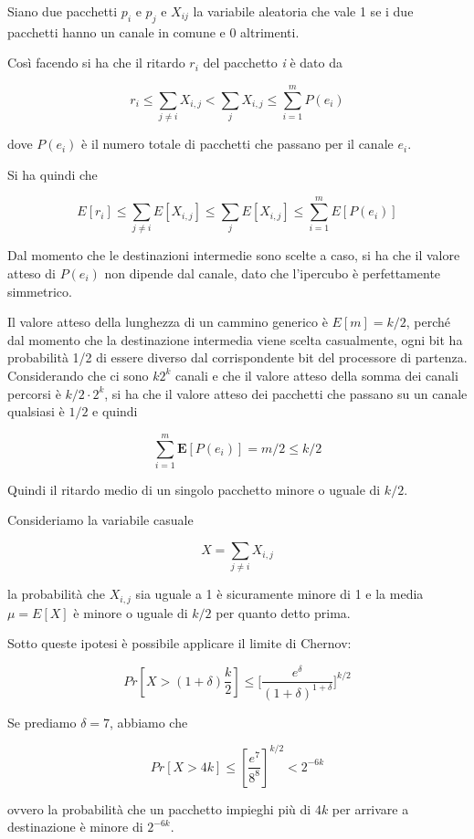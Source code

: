 Siano due pacchetti $p_i$ e $p_j$ e $X_{ij}$ la variabile aleatoria che vale 1 se i due pacchetti hanno un canale in comune e 0 altrimenti.

Così facendo si ha che il ritardo $r_i$ del pacchetto \emph{i} è dato da

$$
r_i \leq \sum\limits_{j \neq i} X_{i,j} < \sum\limits_{j} X_{i,j} \leq \sum\limits_{i = 1}^{m} P(e_i)
$$

dove $P(e_i)$ è il numero totale di pacchetti che passano per il canale $e_i$.

Si ha quindi che

$$
E[r_i] \leq \sum\limits_{j \neq i} E[X_{i,j}] \leq \sum\limits_{j} E[X_{i,j}] \leq \sum\limits_{i = 1}^{m} E[P(e_i)]
$$

Dal momento che le destinazioni intermedie sono scelte a caso, si ha che il valore atteso di $P(e_i)$ non dipende dal canale, dato che l'ipercubo è perfettamente simmetrico.

Il valore atteso della lunghezza di un cammino generico è $E[m] = k/2$, perché dal momento che la destinazione intermedia viene scelta casualmente, ogni bit ha probabilità 1/2 di essere diverso dal corrispondente bit del processore di partenza. 
Considerando che ci sono $k 2^k$ canali e che il valore atteso della somma dei canali percorsi è $k/2 \cdot  2^{k}$, si ha che il valore atteso dei pacchetti che passano su un canale qualsiasi è $1/2$ e quindi

$$
\sum\limits_{i = 1}^{m} \textbf{E}[P(e_i)] = m/2 \leq k/2
$$

Quindi il ritardo medio di un singolo pacchetto minore o uguale di $k/2$.

Consideriamo la variabile casuale

$$
X = \sum\limits_{j \neq i} X_{i,j}
$$

la probabilità che $X_{i,j}$ sia uguale a 1 è sicuramente minore di 1 e la media $\mu =E[X]$ è minore o uguale di $k/2$ per quanto detto prima.

Sotto queste ipotesi è possibile applicare il limite di Chernov:

$$
Pr[X > (1 + \delta)\frac{k}{2}] \leq \Big[ \frac{e^\delta}{(1+\delta)^{1+\delta}} \big]^{k/2}
$$

Se prediamo $\delta = 7$, abbiamo che

$$
Pr[X > 4k] \leq  [\frac{e^7}{8^8}]^{k/2} < 2^{-6k}
$$

ovvero la probabilità che un pacchetto impieghi più di $4k$ per arrivare a destinazione è minore di $2^{-6k}$.

